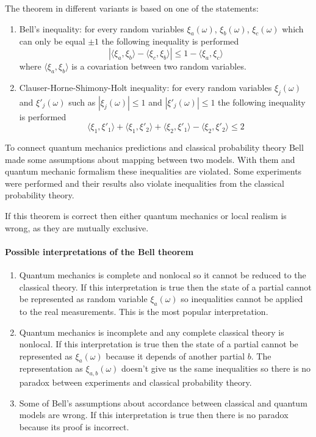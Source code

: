 \documentclass[12pt]{article}
\begin{document}
The theorem in different variants is based on one of the statements: 
\begin{enumerate}
\item Bell's inequality: for every random variables $\xi_a(\omega)$, $\xi_b(\omega)$, $\xi_c(\omega)$ which can only be equal $\pm 1$ the following inequality is performed
$$| \langle\xi_a,\xi_b\rangle -  \langle\xi_c,\xi_b\rangle | \leq 1 - \langle\xi_a,\xi_c\rangle$$
where $\langle\xi_a,\xi_b\rangle$ is a covariation between two random variables.

\item  Clauser-Horne-Shimony-Holt inequality: for every random variables $\xi_j(\omega)$ and $\xi'_j(\omega)$ such as $|\xi_j(\omega)| \leq 1$ and $|\xi'_j(\omega)| \leq 1$ the following inequality is performed
$$\langle\xi_1,\xi'_1\rangle + \langle\xi_1,\xi'_2\rangle + \langle\xi_2,\xi'_1\rangle -  \langle\xi_2,\xi'_2\rangle \leq 2$$
\end{enumerate}

To connect quantum mechanics predictions and classical probability theory Bell made some assumptions about mapping between two models. With them and quantum mechanic formalism these inequalities are violated. Some experiments were performed and their results also violate inequalities from the classical probability theory.

If this theorem is correct then either quantum mechanics or local realism is wrong, as they are mutually exclusive.

\paragraph{Possible interpretations of the Bell theorem} 
\begin{enumerate}
\item Quantum mechanics is complete and nonlocal so it cannot be reduced to the classical theory.
If this interpretation is true then the state of a partial cannot be represented as random variable $\xi_a(\omega)$ so inequalities cannot be applied to the real measurements. This is the most popular interpretation.

\item Quantum mechanics is incomplete and any complete classical theory is nonlocal.
If this interpretation is true then the state of a partial cannot be represented as $\xi_a(\omega)$ because it depends of another partial $b$. The representation as $\xi_{a,b}(\omega)$ doesn't give us the same inequalities so there is no paradox between experiments and classical probability theory.

\item Some of Bell's assumptions about accordance between classical and quantum models are wrong. If this interpretation is true then there is no paradox because its proof is incorrect.
\end{enumerate}
\end{document}
